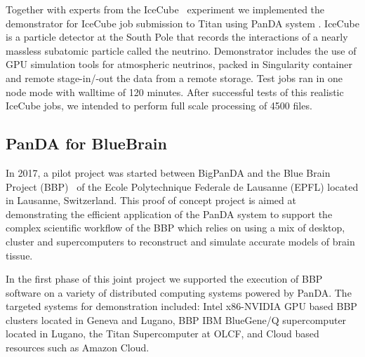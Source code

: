 \documentclass{webofc}
\begin{document}
Together with experts from the IceCube~\cite{doi:10.1063/1.3480478} experiment we implemented the demonstrator for IceCube job submission to Titan using PanDA system . 
IceCube is a particle detector at the South Pole that records the interactions of a nearly massless subatomic particle called the neutrino. 
Demonstrator includes the use of GPU simulation tools for atmospheric neutrinos, packed in Singularity container and remote stage-in/-out the data from a remote storage. 
Test jobs ran in one node mode with walltime of 120 minutes. After successful tests of this realistic IceCube jobs, we intended to perform full scale processing of 4500 files.


\subsection{PanDA for BlueBrain} \label{section_bluebrain}

In 2017, a pilot project was started between BigPanDA and the Blue Brain Project (BBP)~\cite{Markram:BBP} of the Ecole Polytechnique Federale de Lausanne (EPFL) located in Lausanne, Switzerland. This proof of concept project is aimed at demonstrating the efficient application of the PanDA system to support the complex scientific workflow of the BBP which relies on using a mix of desktop, cluster and supercomputers to reconstruct and simulate accurate models of brain tissue.

In the first phase of this joint project we supported the execution of BBP software on a variety of distributed computing systems powered by PanDA. 
The targeted systems for demonstration included: Intel x86-NVIDIA GPU based BBP clusters located in Geneva and Lugano, BBP IBM BlueGene/Q supercomputer located in Lugano, the Titan Supercomputer at OLCF, and Cloud based resources such as Amazon Cloud.
\end{document}
